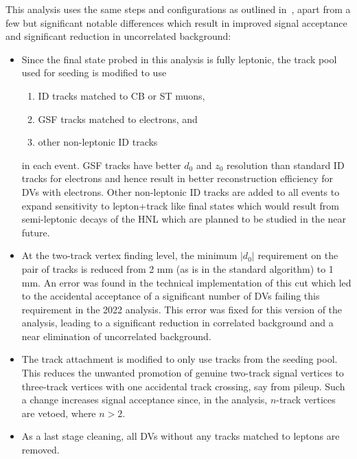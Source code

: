 This analysis uses the same steps and configurations as outlined in~\cite{ATL-PHYS-PUB-2019-013}, apart from a few but significant notable differences which result in improved signal acceptance and significant reduction in uncorrelated background:
\begin{itemize}
    \item Since the final state probed in this analysis is fully leptonic, the track pool used for seeding is modified to use
    \begin{enumerate}
        \item ID tracks matched to CB or ST muons,
        \item GSF tracks matched to electrons, and
        \item other non-leptonic ID tracks
    \end{enumerate}
    in each event. GSF tracks have better $d_0$ and $z_0$ resolution than standard ID tracks for electrons and hence result in better reconstruction efficiency for DVs with electrons. Other non-leptonic ID tracks are added to all events to expand sensitivity to lepton+track like final states which would result from semi-leptonic decays of the HNL which are planned to be studied in the near future. 
    \item At the two-track vertex finding level, the minimum $|d_0|$ requirement on the pair of tracks is reduced from 2 mm (as is in the standard algorithm) to 1 mm. An error was found in the technical implementation of this cut which led to the accidental acceptance of a significant number of DVs failing this requirement in the 2022 analysis. This error was fixed for this version of the analysis, leading to a significant reduction in correlated background and a near elimination of uncorrelated background.
    \item The track attachment is modified to only use tracks from the seeding pool. This reduces the unwanted promotion of genuine two-track signal vertices to three-track vertices with one accidental track crossing, say from pileup. Such a change increases signal acceptance since, in the analysis, $n$-track vertices are vetoed, where $n>2$.
    \item As a last stage cleaning, all DVs without any tracks matched to leptons are removed.
\end{itemize}

